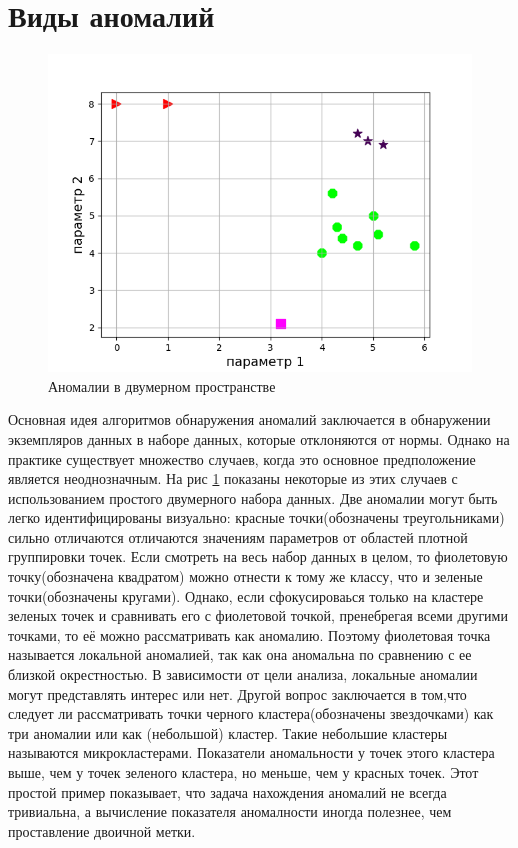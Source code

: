 \section{Виды аномалий}
\begin{figure}
	\centering
	\includegraphics[width=.5\textwidth]{img/1_1.png}
	\caption{Аномалии в двумерном пространстве}
	\label{fig01}
\end{figure}

Основная идея алгоритмов обнаружения аномалий заключается в обнаружении экземпляров данных в наборе данных, которые отклоняются от нормы. Однако на практике существует множество случаев, когда это основное предположение является неоднозначным. На рис \ref{fig01} показаны некоторые из этих случаев с использованием простого двумерного набора данных. Две аномалии могут быть легко идентифицированы визуально: красные  точки(обозначены треугольниками)  сильно отличаются отличаются значениям параметров от областей плотной группировки точек. Если смотреть на весь набор данных в целом, то фиолетовую точку(обозначена квадратом) можно отнести к тому же классу, что и зеленые точки(обозначены кругами).  Однако, если сфокусироваься только на кластере зеленых точек и сравнивать его с фиолетовой точкой, пренебрегая всеми другими точками, то её можно рассматривать как аномалию. Поэтому фиолетовая точка называется локальной аномалией, так как она аномальна по сравнению с ее близкой окрестностью. В зависимости от цели анализа, локальные  аномалии могут представлять интерес или нет. 
Другой  вопрос  заключается в том,что следует ли рассматривать точки черного кластера(обозначены звездочками)  как три аномалии или как (небольшой) кластер. Такие небольшие кластеры  называются микрокластерами. Показатели аномальности у точек этого кластера выше, чем  у точек зеленого кластера, но меньше, чем  у красных точек. Этот простой пример  показывает, что задача нахождения аномалий не всегда тривиальна, а вычисление показателя аномалности иногда полезнее, чем проставление двоичной метки.


